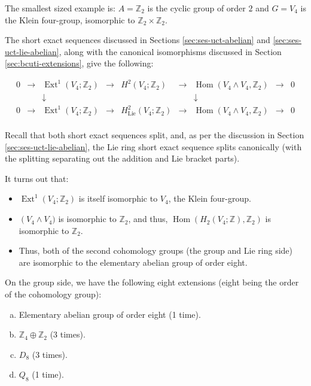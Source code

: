 \documentclass{ucetd}
\begin{document}
The smallest sized example is: $A = \mathbb{Z}_2$ is the cyclic group
of order $2$ and $G = V_4$ is the Klein four-group, isomorphic to
$\mathbb{Z}_2 \times \mathbb{Z}_2$.

The short exact sequences discussed in Sections
\ref{sec:ses-uct-abelian} and \ref{sec:ses-uct-lie-abelian}, along
with the canonical isomorphisms discussed in Section
\ref{sec:bcuti-extensions}, give the following:

$$\begin{array}{ccccccccc}
0 & \to & \operatorname{Ext}^1(V_4;\mathbb{Z}_2) & \to & H^2(V_4;\mathbb{Z}_2) & \to & \operatorname{Hom}(V_4 \wedge V_4,\mathbb{Z}_2) & \to & 0 \\
& & \downarrow & & & & \downarrow & & \\
0 & \to & \operatorname{Ext}^1(V_4;\mathbb{Z}_2) & \to & H^2_{\text{Lie}}(V_4;\mathbb{Z}_2) & \to & \operatorname{Hom}(V_4 \wedge V_4,\mathbb{Z}_2) & \to & 0\\
\end{array}$$

Recall that both short exact sequences split, and, as per the
discussion in Section \ref{sec:ses-uct-lie-abelian}, the Lie ring
short exact sequence splits canonically (with the splitting separating
out the addition and Lie bracket parts).

It turns out that:

\begin{itemize}
\item $\operatorname{Ext}^1(V_4;\mathbb{Z}_2)$ is itself isomorphic to $V_4$, the Klein four-group.
\item $\operatorname(V_4 \wedge V_4)$ is isomorphic to $\mathbb{Z}_2$,
  and thus, $\operatorname{Hom}(H_2(V_4;\mathbb{Z}),\mathbb{Z}_2)$ is
  isomorphic to $\mathbb{Z}_2$.
\item Thus, both of the second cohomology groups (the group and Lie
  ring side) are isomorphic to the elementary abelian group of order
  eight.
\end{itemize}

On the group side, we have the following eight extensions (eight being
the order of the cohomology group):

\begin{enumerate}[(a)]
\item Elementary abelian group of order eight (1 time).
\item $\mathbb{Z}_4 \oplus \mathbb{Z}_2$ (3 times).
\item $D_8$ (3 times).
\item $Q_8$ (1 time).
\end{enumerate}
\end{document}
